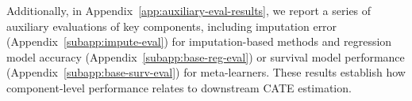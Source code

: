\documentclass{article} %
\begin{document}
Additionally, in Appendix~\ref{app:auxiliary-eval-results}, we report a series of auxiliary evaluations of key components, including imputation error (Appendix~\ref{subapp:impute-eval}) for imputation-based methods and regression model accuracy (Appendix~\ref{subapp:base-reg-eval}) or survival model performance (Appendix~\ref{subapp:base-surv-eval}) for meta-learners. These results establish how component-level performance relates to downstream CATE estimation.

\end{document}
